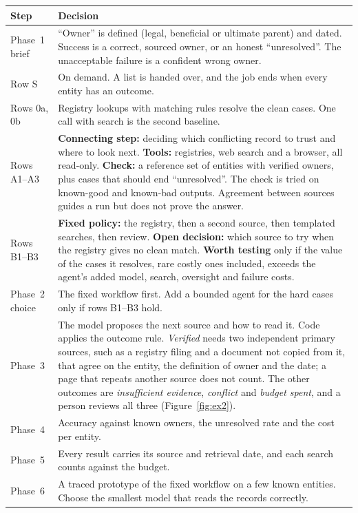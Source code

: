\documentclass[10pt]{article}
\begin{document}
\begin{center}
\small
\begin{tabularx}{\linewidth}{@{}p{2.7cm} L@{}}
\toprule
Step & Decision \\
\midrule
Phase~1 brief & ``Owner'' is defined (legal, beneficial or ultimate parent) and dated. Success is a correct, sourced owner, or an honest ``unresolved''. The unacceptable failure is a confident wrong owner. \\
Row S & On demand. A list is handed over, and the job ends when every entity has an outcome. \\
Rows 0a, 0b & Registry lookups with matching rules resolve the clean cases. One call with search is the second baseline. \\
Rows A1--A3 & \textbf{Connecting step:} deciding which conflicting record to trust and where to look next. \textbf{Tools:} registries, web search and a browser, all read-only. \textbf{Check:} a reference set of entities with verified owners, plus cases that should end ``unresolved''. The check is tried on known-good and known-bad outputs. Agreement between sources guides a run but does not prove the answer. \\
Rows B1--B3 & \textbf{Fixed policy:} the registry, then a second source, then templated searches, then review. \textbf{Open decision:} which source to try when the registry gives no clean match. \textbf{Worth testing} only if the value of the cases it resolves, rare costly ones included, exceeds the agent's added model, search, oversight and failure costs. \\
Phase~2 choice & The fixed workflow first. Add a bounded agent for the hard cases only if rows B1--B3 hold. \\
Phase~3 & The model proposes the next source and how to read it. Code applies the outcome rule. \emph{Verified} needs two independent primary sources, such as a registry filing and a document not copied from it, that agree on the entity, the definition of owner and the date; a page that repeats another source does not count. The other outcomes are \emph{insufficient evidence}, \emph{conflict} and \emph{budget spent}, and a person reviews all three (Figure~\ref{fig:ex2}). \\
Phase~4 & Accuracy against known owners, the unresolved rate and the cost per entity. \\
Phase~5 & Every result carries its source and retrieval date, and each search counts against the budget. \\
Phase~6 & A traced prototype of the fixed workflow on a few known entities. Choose the smallest model that reads the records correctly. \\

\end{tabularx}
\end{center}
\end{document}
